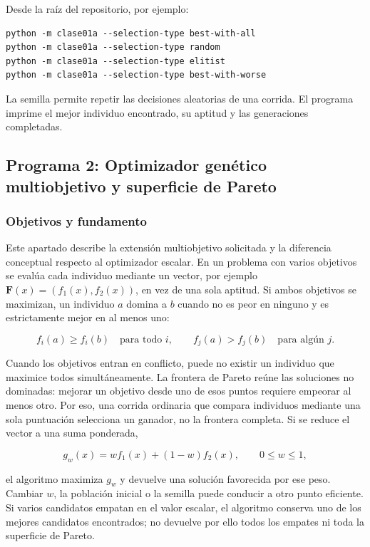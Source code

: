 \documentclass[12pt,a4paper]{article}
\begin{document}
Desde la raíz del repositorio, por ejemplo:

\begin{verbatim}
python -m clase01a --selection-type best-with-all
python -m clase01a --selection-type random
python -m clase01a --selection-type elitist
python -m clase01a --selection-type best-with-worse
\end{verbatim}

La semilla permite repetir las decisiones aleatorias de una corrida. El
programa imprime el mejor individuo encontrado, su aptitud y las generaciones
completadas.

\subsection{Programa 2: Optimizador genético multiobjetivo y superficie de Pareto}

\subsubsection{Objetivos y fundamento}

Este apartado describe la extensión multiobjetivo solicitada y la diferencia
conceptual respecto al optimizador escalar. En un problema con varios objetivos
se evalúa cada individuo mediante un vector, por ejemplo
\(\mathbf{F}(x)=(f_1(x),f_2(x))\), en vez de una sola aptitud. Si ambos objetivos
se maximizan, un individuo \(a\) domina a \(b\) cuando no es peor en ninguno y
es estrictamente mejor en al menos uno:

\[
  f_i(a)\geq f_i(b)\quad\text{para todo }i,
  \qquad f_j(a)>f_j(b)\quad\text{para algún }j.
\]

Cuando los objetivos entran en conflicto, puede no existir un individuo que
maximice todos simultáneamente. La frontera de Pareto reúne las soluciones no
dominadas: mejorar un objetivo desde uno de esos puntos requiere empeorar al
menos otro. Por eso, una corrida ordinaria que compara individuos mediante una
sola puntuación selecciona un ganador, no la frontera completa. Si se reduce el
vector a una suma ponderada,

\[
  g_{w}(x)=w f_1(x)+(1-w)f_2(x),\qquad 0\leq w\leq1,
\]

el algoritmo maximiza \(g_w\) y devuelve una solución favorecida por ese peso.
Cambiar \(w\), la población inicial o la semilla puede conducir a otro punto
eficiente. Si varios candidatos empatan en el valor escalar, el algoritmo
conserva uno de los mejores candidatos encontrados; no devuelve por ello todos
los empates ni toda la superficie de Pareto.
\end{document}
